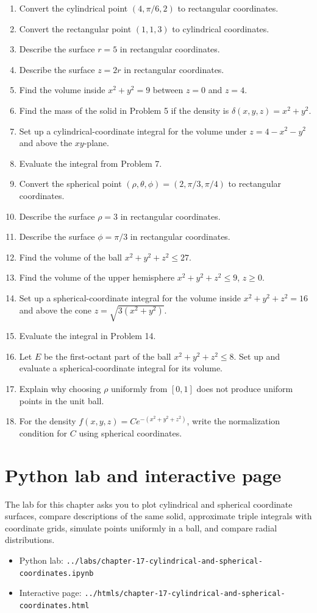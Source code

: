 \documentclass[11pt,oneside]{book}
\begin{document}
\begin{enumerate}
  \item Convert the cylindrical point $(4,\pi/6,2)$ to rectangular coordinates.
  \item Convert the rectangular point $(1,1,3)$ to cylindrical coordinates.
  \item Describe the surface $r=5$ in rectangular coordinates.
  \item Describe the surface $z=2r$ in rectangular coordinates.
  \item Find the volume inside $x^2+y^2=9$ between $z=0$ and $z=4$.
  \item Find the mass of the solid in Problem 5 if the density is $\delta(x,y,z)=x^2+y^2$.
  \item Set up a cylindrical-coordinate integral for the volume under $z=4-x^2-y^2$ and above the $xy$-plane.
  \item Evaluate the integral from Problem 7.
  \item Convert the spherical point $(\rho,\theta,\phi)=(2,\pi/3,\pi/4)$ to rectangular coordinates.
  \item Describe the surface $\rho=3$ in rectangular coordinates.
  \item Describe the surface $\phi=\pi/3$ in rectangular coordinates.
  \item Find the volume of the ball $x^2+y^2+z^2\le 27$.
  \item Find the volume of the upper hemisphere $x^2+y^2+z^2\le 9$, $z\ge 0$.
  \item Set up a spherical-coordinate integral for the volume inside $x^2+y^2+z^2=16$ and above the cone $z=\sqrt{3(x^2+y^2)}$.
  \item Evaluate the integral in Problem 14.
  \item Let $E$ be the first-octant part of the ball $x^2+y^2+z^2\le 8$. Set up and evaluate a spherical-coordinate integral for its volume.
  \item Explain why choosing $\rho$ uniformly from $[0,1]$ does not produce uniform points in the unit ball.
  \item For the density $f(x,y,z)=Ce^{-(x^2+y^2+z^2)}$, write the normalization condition for $C$ using spherical coordinates.
\end{enumerate}

\section{Python lab and interactive page}

The lab for this chapter asks you to plot cylindrical and spherical coordinate surfaces, compare descriptions of the same solid, approximate triple integrals with coordinate grids, simulate points uniformly in a ball, and compare radial distributions.

\begin{itemize}
  \item Python lab: \texttt{../labs/chapter-17-cylindrical-and-spherical-coordinates.ipynb}
  \item Interactive page: \texttt{../htmls/chapter-17-cylindrical-and-spherical-coordinates.html}
\end{itemize}
\end{document}
